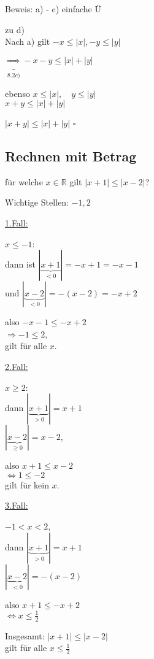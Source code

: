 \documentclass[a4paper, 12pt, twoside] {article}
\begin{document}
Beweis: a) - c) einfache Ü

zu d) \\
Nach a) gilt $-x \leq |x|, -y \leq |y|$

$\underbrace{\Rightarrow}_{8.2c)} -x -y \leq |x| + |y|$

ebenso $x \leq |x|, \quad y \leq |y|$ \\
$x+y \leq |x| + |y|$


$|x + y| \leq |x| + |y|$ \hfill $\square$

\subsection{Rechnen mit Betrag} %

für welche $x \in \mathbb{R}$ gilt $|x+1| \leq |x-2|$?


Wichtige Stellen: $-1, 2$ %

\underline{1.Fall:}

$x \leq -1$: \\
dann ist $|\underbrace{x+1}_{< 0}| = -x + 1 = -x - 1$ \\
und $ |\underbrace{x-2}_{< 0}| = -(x-2) = -x + 2$

also $-x -1 \leq -x + 2$ \\
$\Rightarrow -1 \leq 2$, \\
gilt für alle $x$.

\underline{2.Fall:}

$x \geq 2$: \\
dann $|\underbrace{x+1}_{> 0}| = x+1$ \\
$|\underbrace{x-2}_{\geq 0}| = x-2$,

also $x + 1 \leq x - 2$ \\
$\Leftrightarrow 1 \leq -2$ \\
gilt für kein $x$.

\underline{3.Fall:}

$-1 < x < 2$, \\
dann $|\underbrace{x+1}_{> 0}| = x + 1$ \\
$|\underbrace{x-2}_{< 0}| = -(x-2)$

also $x+1 \leq -x + 2$ \\
$\Leftrightarrow x \leq \frac{1}{2}$

Insgesamt: $|x + 1| \leq |x-2|$ \\
gilt für alle $x \leq \frac{1}{2}$
\end{document}
